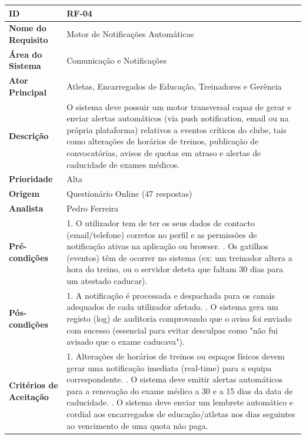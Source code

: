 {\begin{xltabular}{\textwidth}{|l|X|}
\textbf{ID} & RF-04 \\ \hline
\textbf{Nome do Requisito} & Motor de Notificações Automáticas \\ \hline
\textbf{Área do Sistema} & Comunicação e Notificações \\ \hline
\textbf{Ator Principal} & Atletas, Encarregados de Educação, Treinadores e Gerência \\ \hline
\textbf{Descrição} & O sistema deve possuir um motor transversal capaz de gerar e enviar alertas automáticos (via push notification, email ou na própria plataforma) relativos a eventos críticos do clube, tais como alterações de horários de treinos, publicação de convocatórias, avisos de quotas em atraso e alertas de caducidade de exames médicos. \\ \hline
\textbf{Prioridade} & Alta \\ \hline
\textbf{Origem} & Questionário Online (47 respostas) \\ \hline
\textbf{Analista} & Pedro Ferreira \\ \hline
\textbf{Pré-condições} & 1. O utilizador tem de ter os seus dados de contacto (email/telefone) corretos no perfil e as permissões de notificação ativas na aplicação ou browser. . Os gatilhos (eventos) têm de ocorrer no sistema (ex: um treinador altera a hora do treino, ou o servidor deteta que faltam 30 dias para um atestado caducar). \\ \hline
\textbf{Pós-condições} & 1. A notificação é processada e despachada para os canais adequados de cada utilizador afetado. . O sistema gera um registo (log) de auditoria comprovando que o aviso foi enviado com sucesso (essencial para evitar desculpas como "não fui avisado que o exame caducava"). \\ \hline
\textbf{Critérios de Aceitação} & 1. Alterações de horários de treinos ou espaços físicos devem gerar uma notificação imediata (real-time) para a equipa correspondente. . O sistema deve emitir alertas automáticos para a renovação do exame médico a 30 e a 15 dias da data de caducidade. . O sistema deve enviar um lembrete automático e cordial aos encarregados de educação/atletas nos dias seguintes ao vencimento de uma quota não paga. \\
\end{xltabular}
}


